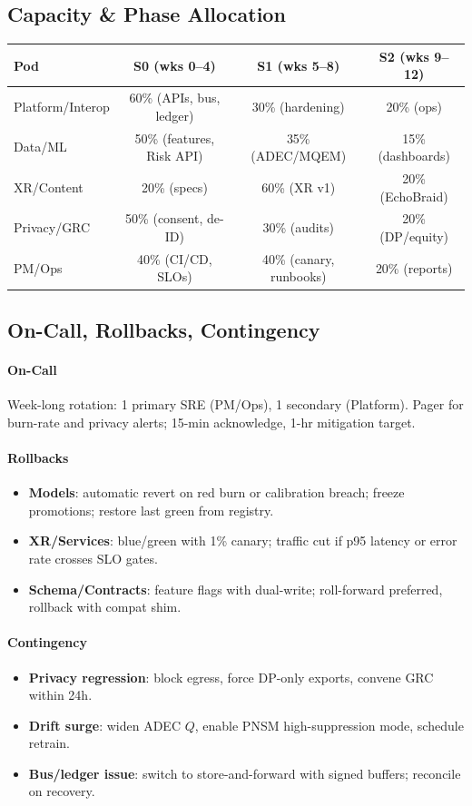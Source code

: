 \documentclass[11pt]{article}
\theoremstyle{plain}
\begin{document}
\subsection{Capacity \& Phase Allocation}
\begin{center}
\begin{tabular}{l c c c}
\hline
\textbf{Pod} & \textbf{S0 (wks 0--4)} & \textbf{S1 (wks 5--8)} & \textbf{S2 (wks 9--12)} \\
\hline
Platform/Interop & 60\% (APIs, bus, ledger) & 30\% (hardening) & 20\% (ops) \\
Data/ML & 50\% (features, Risk API) & 35\% (ADEC/MQEM) & 15\% (dashboards) \\
XR/Content & 20\% (specs) & 60\% (XR v1) & 20\% (EchoBraid) \\
Privacy/GRC & 50\% (consent, de-ID) & 30\% (audits) & 20\% (DP/equity) \\
PM/Ops & 40\% (CI/CD, SLOs) & 40\% (canary, runbooks) & 20\% (reports) \\
\hline
\end{tabular}
\end{center}

\subsection{On-Call, Rollbacks, Contingency}
\paragraph{On-Call}
Week-long rotation: 1 primary SRE (PM/Ops), 1 secondary (Platform). Pager for burn-rate and privacy alerts; 15-min acknowledge, 1-hr mitigation target.
\paragraph{Rollbacks}
\begin{itemize}
  \item \textbf{Models}: automatic revert on red burn or calibration breach; freeze promotions; restore last green from registry.
  \item \textbf{XR/Services}: blue/green with 1\% canary; traffic cut if p95 latency or error rate crosses SLO gates.
  \item \textbf{Schema/Contracts}: feature flags with dual-write; roll-forward preferred, rollback with compat shim.
\end{itemize}
\paragraph{Contingency}
\begin{itemize}
  \item \textbf{Privacy regression}: block egress, force DP-only exports, convene GRC within 24h.
  \item \textbf{Drift surge}: widen ADEC $Q$, enable PNSM high-suppression mode, schedule retrain.
  \item \textbf{Bus/ledger issue}: switch to store-and-forward with signed buffers; reconcile on recovery.
\end{itemize}
\end{document}
